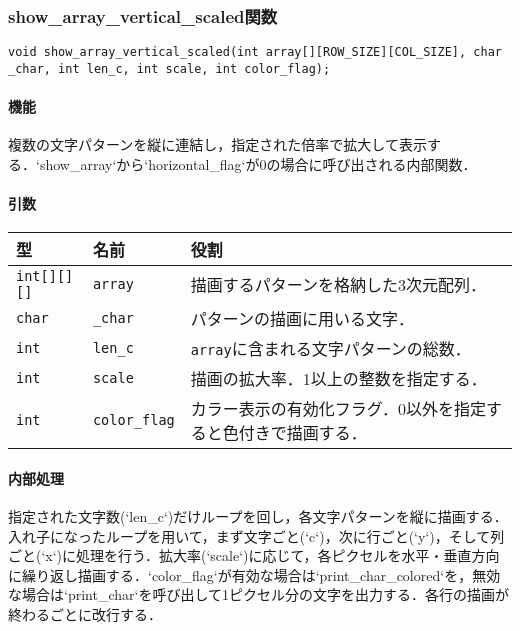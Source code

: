 \documentclass[uplatex]{jsarticle}
\begin{document}
\subsubsection{show\_array\_vertical\_scaled関数}
\texttt{void show\_array\_vertical\_scaled(int array[][ROW\_SIZE][COL\_SIZE], char \_char, int len\_c, int scale, int color\_flag);}
\paragraph{機能}
複数の文字パターンを縦に連結し，指定された倍率で拡大して表示する．`show\_array`から`horizontal\_flag`が0の場合に呼び出される内部関数．

\paragraph{引数}
\begin{center}
    \begin{tabular}{|l|l|p{7cm}|}
        \hline
        \textbf{型} & \textbf{名前} & \textbf{役割} \\ \hline
        \texttt{int[][][]} & \texttt{array} & 描画するパターンを格納した3次元配列． \\ \hline
        \texttt{char} & \texttt{\_char} & パターンの描画に用いる文字． \\ \hline
        \texttt{int} & \texttt{len\_c} & \texttt{array}に含まれる文字パターンの総数． \\ \hline
        \texttt{int} & \texttt{scale} & 描画の拡大率．1以上の整数を指定する． \\ \hline
        \texttt{int} & \texttt{color\_flag} & カラー表示の有効化フラグ．0以外を指定すると色付きで描画する． \\ \hline
    \end{tabular}
\end{center}

\paragraph{内部処理}
指定された文字数(`len\_c`)だけループを回し，各文字パターンを縦に描画する．入れ子になったループを用いて，まず文字ごと(`c`)，次に行ごと(`y`)，そして列ごと(`x`)に処理を行う．拡大率(`scale`)に応じて，各ピクセルを水平・垂直方向に繰り返し描画する．`color\_flag`が有効な場合は`print\_char\_colored`を，無効な場合は`print\_char`を呼び出して1ピクセル分の文字を出力する．各行の描画が終わるごとに改行する．
\end{document}
